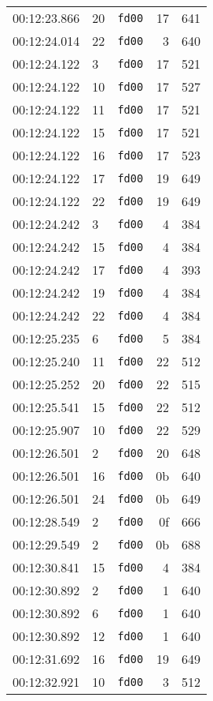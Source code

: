 \documentclass{article}
\begin{document}
\begin{longtable}{lllrr}
00:12:23.866 & 20 & \texttt{fd00} & 17 & 641 \\
00:12:24.014 & 22 & \texttt{fd00} & 3 & 640 \\
00:12:24.122 & 3 & \texttt{fd00} & 17 & 521 \\
00:12:24.122 & 10 & \texttt{fd00} & 17 & 527 \\
00:12:24.122 & 11 & \texttt{fd00} & 17 & 521 \\
00:12:24.122 & 15 & \texttt{fd00} & 17 & 521 \\
00:12:24.122 & 16 & \texttt{fd00} & 17 & 523 \\
00:12:24.122 & 17 & \texttt{fd00} & 19 & 649 \\
00:12:24.122 & 22 & \texttt{fd00} & 19 & 649 \\
00:12:24.242 & 3 & \texttt{fd00} & 4 & 384 \\
00:12:24.242 & 15 & \texttt{fd00} & 4 & 384 \\
00:12:24.242 & 17 & \texttt{fd00} & 4 & 393 \\
00:12:24.242 & 19 & \texttt{fd00} & 4 & 384 \\
00:12:24.242 & 22 & \texttt{fd00} & 4 & 384 \\
00:12:25.235 & 6 & \texttt{fd00} & 5 & 384 \\
00:12:25.240 & 11 & \texttt{fd00} & 22 & 512 \\
00:12:25.252 & 20 & \texttt{fd00} & 22 & 515 \\
00:12:25.541 & 15 & \texttt{fd00} & 22 & 512 \\
00:12:25.907 & 10 & \texttt{fd00} & 22 & 529 \\
00:12:26.501 & 2 & \texttt{fd00} & 20 & 648 \\
00:12:26.501 & 16 & \texttt{fd00} & 0b & 640 \\
00:12:26.501 & 24 & \texttt{fd00} & 0b & 649 \\
00:12:28.549 & 2 & \texttt{fd00} & 0f & 666 \\
00:12:29.549 & 2 & \texttt{fd00} & 0b & 688 \\
00:12:30.841 & 15 & \texttt{fd00} & 4 & 384 \\
00:12:30.892 & 2 & \texttt{fd00} & 1 & 640 \\
00:12:30.892 & 6 & \texttt{fd00} & 1 & 640 \\
00:12:30.892 & 12 & \texttt{fd00} & 1 & 640 \\
00:12:31.692 & 16 & \texttt{fd00} & 19 & 649 \\
00:12:32.921 & 10 & \texttt{fd00} & 3 & 512 \\

\end{longtable}
\end{document}
